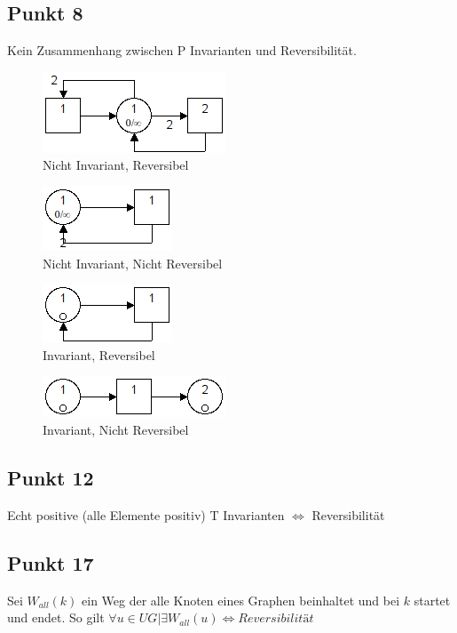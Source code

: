 \documentclass[10pt]{scrartcl}
\begin{document}
		\subsection{Punkt 8}
		Kein Zusammenhang zwischen P Invarianten und Reversibilität.
				\begin{figure}[H]
    				\centering	
					\includegraphics[scale=0.5]{aufg081.png}		
            		\caption{Nicht Invariant, Reversibel}
				\end{figure}
				\begin{figure}[H]
    				\centering	
					\includegraphics[scale=0.5]{aufg082.png}		
            		\caption{Nicht Invariant, Nicht Reversibel}
				\end{figure}
				\begin{figure}[H]
    				\centering	
					\includegraphics[scale=0.5]{aufg083.png}		
            		\caption{Invariant, Reversibel}
				\end{figure}
				\begin{figure}[H]
    				\centering	
					\includegraphics[scale=0.5]{aufg084.png}		
            		\caption{Invariant, Nicht Reversibel}
				\end{figure}
				
				\subsection{Punkt 12}
				Echt positive (alle Elemente positiv) T Invarianten $\Longleftrightarrow$ Reversibilität
				
				\subsection{Punkt 17}
				Sei $W_{all}(k)$ ein Weg der alle Knoten eines Graphen beinhaltet und bei $k$ startet und endet.
				So gilt $\forall u \in UG | \exists  W_{all}(u) \Longleftrightarrow \textit{Reversibilität}$	
				
\end{document}
